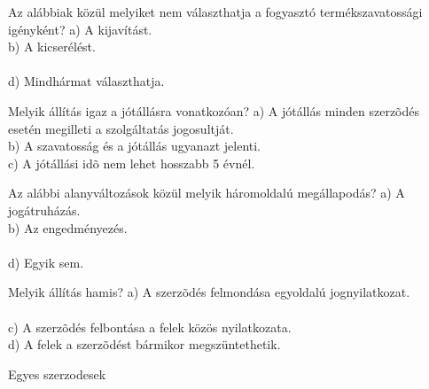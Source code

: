 \begin{frame}

\begin{tcolorbox}[title={164. Kérdés}]
Az alábbiak közül melyiket nem választhatja a fogyasztó termékszavatossági igényként?
\tcblower
a) A kijavítást.\\
b) A kicserélést.\\
\\
d) Mindhármat választhatja.
\end{tcolorbox}

\begin{tcolorbox}[title={165. Kérdés}]
Melyik állítás igaz a jótállásra vonatkozóan?
\tcblower
a) A jótállás minden szerzõdés esetén megilleti a szolgáltatás jogosultját.\\
b) A szavatosság és a jótállás ugyanazt jelenti.\\
c) A jótállási idõ nem lehet hosszabb 5 évnél.\\
\end{tcolorbox}

\begin{tcolorbox}[title={166. Kérdés}]
Az alábbi alanyváltozások közül melyik háromoldalú megállapodás?
\tcblower
a) A jogátruházás.\\
b) Az engedményezés.\\
\\
d) Egyik sem.
\end{tcolorbox}

\begin{tcolorbox}[title={167. Kérdés}]
Melyik állítás hamis?
\tcblower
a) A szerzõdés felmondása egyoldalú jognyilatkozat.\\
\\
c) A szerzõdés felbontása a felek közös nyilatkozata.\\
d) A felek a szerzõdést bármikor megszüntethetik.
\end{tcolorbox}

\end{frame}

\begin{frame}[plain]
\begin{tcolorbox}[center, colback={myyellow}, coltext={black}, colframe={myyellow}]
    { Egyes szerzodesek}\\
\end{tcolorbox}
\end{frame}

